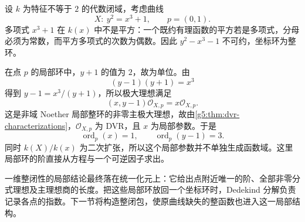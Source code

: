 \begin{example}
\label{g5:exm:local-parameter-not-field-generator}
	设 \(k\) 为特征不等于 \(2\) 的代数闭域，考虑曲线
	\[
		X:\ y^2=x^3+1,\qquad p=(0,1).
	\]
	多项式 \(x^3+1\) 在 \(k(x)\) 中不是平方：一个既约有理函数的平方若是多项式，分母必须为常数，而平方多项式的次数为偶数。因此 \(y^2-x^3-1\) 不可约，坐标环为整环。

	在点 \(p\) 的局部环中，\(y+1\) 的值为 \(2\)，故为单位。由
	\[
		(y-1)(y+1)=x^3
	\]
	得到 \(y-1=x^3/(y+1)\)，所以极大理想满足
	\[
		(x,y-1)\mathcal O_{X,p}=x\mathcal O_{X,p}.
	\]
	这是非域 Noether 局部整环的非零主极大理想，故由\cref{g5:thm:dvr-characterizations}，\(\mathcal O_{X,p}\) 为 DVR，且 \(x\) 为局部参数。于是
	\[
		\operatorname{ord}_p(x)=1,\qquad
		\operatorname{ord}_p(y-1)=3.
	\]
	同时 \(k(X)/k(x)\) 为二次扩张，所以这个局部参数并不单独生成函数域。这里局部环的阶直接从方程与一个可逆因子求出。
\end{example}

一维整闭性的局部结论最终落在统一化元上：它给出点附近唯一的阶、全部非零分式理想及主理想商的长度。把这些局部环放回一个坐标环时，Dedekind 分解负责记录各点的指数。下一节将构造整闭包，使原曲线缺失的整函数也进入这一局部结构。

